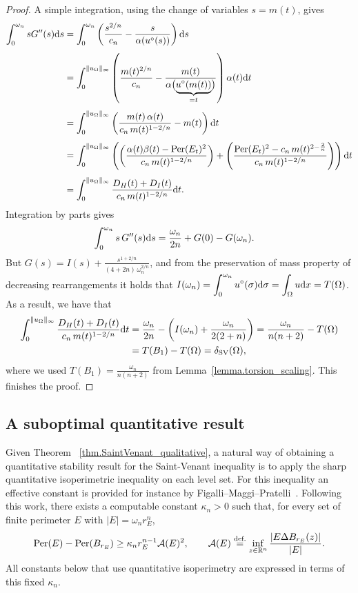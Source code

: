 \documentclass[11pt]{amsart}
\theoremstyle{plain}
\theoremstyle{definition}
\newcommand{\dsty}{\displaystyle}
\newcommand{\eqdef}{\overset{\text{def.}}{=}}
\def\dd{{\rm d}}
\newcommand\Per{\mathop{\rm Per}}
\newcommand\SV{\mathop{\rm SV}}
\begin{document}
\begin{proof}
A simple integration, using the change of variables $s=m(t)$, gives
\begin{align*}
  \int_0^{\omega_n}s G''(s)\dd s
  &=\int_0^{\omega_n}\left(\frac{s^{2/n}}{c_n}-\frac{s}{\alpha(u^\circ(s))}\right)\dd s\\[4pt]
  &=\int_0^{\|u_\Omega\|_\infty}\left(\frac{m(t)^{2/n}}{c_n}
     -\frac{m(t)}{\alpha\bigl(\underbrace{u^\circ(m(t))}_{=t}\bigr)}\right)\alpha(t)\dd t\\[4pt]
  &=\int_0^{\|u_\Omega\|_\infty}\left(\frac{m(t)\,\alpha(t)}{c_n\,m(t)^{1-2/n}}-m(t)\right)\dd t\\[4pt]
 &=\int_0^{\|u_\Omega\|_\infty}\left(\left(\frac{\alpha(t)\beta(t)-\Per(E_t)^2}{c_n\,m(t)^{1-2/n}}\right)
     +\left(\frac{\Per(E_t)^2-c_n\,m(t)^{2-\frac{2}{n}}}{c_n\,m(t)^{1-2/n}}\right)\right)\dd t\\[4pt]
  &=\int_0^{\|u_\Omega\|_\infty}\frac{D_H(t)+D_I(t)}{c_n\,m(t)^{1-2/n}}\dd t .
\end{align*}
Integration by parts gives
\begin{align*}
  \int_0^{\omega_n}s\,G''(s)\dd s
  &= \frac{\omega_n}{2n} + G(0)-G(\omega_n).
\end{align*}
But $\dsty G(s)=I(s)+\frac{s^{1+2/n}}{(4+2n)\,\omega_n^{2/n}}$, and from the
preservation of mass property of decreasing rearrangements it holds that
$\dsty I(\omega_n)=\int_0^{\omega_n} u^\circ(\sigma)\dd \sigma = \int_\Omega u \dd x = T(\Omega)$. As a result, we have that
\begin{align*}
  \int_0^{\|u_\Omega\|_\infty}\frac{D_H(t)+D_I(t)}{c_n\,m(t)^{1-2/n}}\dd t
  &=\frac{\omega_n}{2n}-\left(I(\omega_n)+\frac{\omega_n}{2(2+n)}\right)
  =\frac{\omega_n}{n(n+2)} - T(\Omega)\\
  &=
  T(B_1) - T(\Omega)
  =
  \delta_{\SV}(\Omega),
\end{align*}
where we used $T(B_1) = \frac{\omega_n}{n(n+2)}$ from Lemma~\ref{lemma.torsion_scaling}. This finishes the proof.
\end{proof}


\subsection{A suboptimal quantitative result}\label{sec.subptimal_quantitative_SV}
Given Theorem ~\ref{thm.SaintVenant_qualitative}, a natural way of obtaining a quantitative stability result for the Saint-Venant inequality is to apply the sharp
quantitative isoperimetric inequality on each level set. For this inequality an effective constant is provided for instance by Figalli--Maggi--Pratelli~\cite{figalli2010mass}. Following this work, there exists a computable constant $\kappa_n>0$ such that, for every set of finite perimeter $E$ with
$|E|=\omega_n r_E^n$,
\begin{equation}\label{eq.quant_isoperimetric}
  \Per(E)-\Per(B_{r_E})
  \ge \kappa_n r_E^{n-1}\mathcal A(E)^2,
  \qquad
  \mathcal A(E)\eqdef
  \inf_{z\in\mathbb R^n}\frac{|E\Delta B_{r_E}(z)|}{|E|}.
\end{equation}
All constants below that use quantitative isoperimetry are expressed in terms
of this fixed $\kappa_n$.
\end{document}
